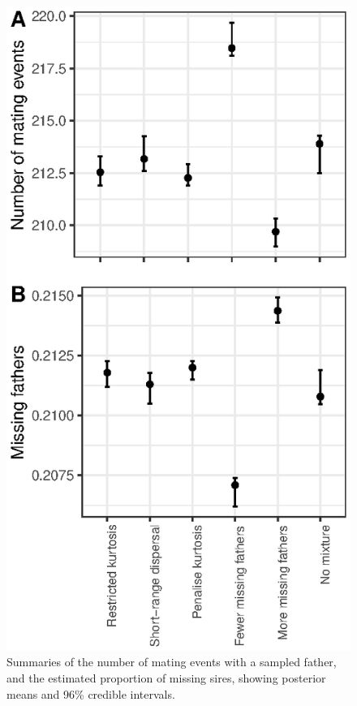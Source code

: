 \documentclass[10pt, a4paper, twocolumn]{article} %
\begin{document}
\begin{figure}
\includegraphics{mating_events.eps}
\caption{Summaries of the number of mating events with a sampled father, and the estimated proportion of missing sires, showing posterior means and 96\% credible intervals.}
\label{mating_events}
\end{figure}
\end{document}
